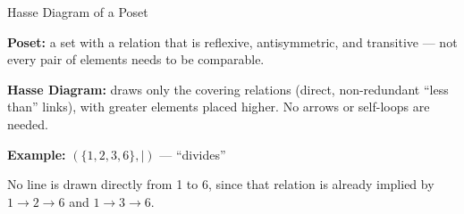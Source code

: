 \documentclass{beamer}
\begin{document}
\begin{frame}{Hasse Diagram of a Poset}

\textbf{Poset:} a set with a relation that is reflexive, antisymmetric,
and transitive --- not every pair of elements needs to be comparable.

\vspace{0.2cm}

\textbf{Hasse Diagram:} draws only the covering relations (direct,
non-redundant ``less than'' links), with greater elements placed higher.
No arrows or self-loops are needed.

\vspace{0.4cm}

\textbf{Example: } $(\{1,2,3,6\}, \mid)$ --- ``divides''

\begin{center}
\end{center}

No line is drawn directly from 1 to 6, since that relation is already
implied by $1 \to 2 \to 6$ and $1 \to 3 \to 6$.

\end{frame}
\end{document}

